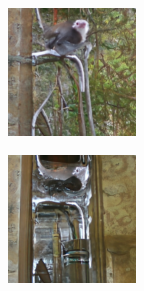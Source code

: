\documentclass{article}
\begin{document}
\begin{figure}
    \begin{subfigure}[b]{0.5\linewidth}
        \begin{subfigure}[b]{0.242\linewidth}
        \includegraphics[width=\linewidth]{figures/imagenet128/solver_samples/imagenet128_fm_ot_281_05.png}
        \end{subfigure}%
        \begin{subfigure}[b]{0.242\linewidth}
        \includegraphics[width=\linewidth]{figures/imagenet128/solver_samples/imagenet128_fm_ot_281_10.png}

\end{subfigure}
\end{subfigure}
\end{figure}
\end{document}
